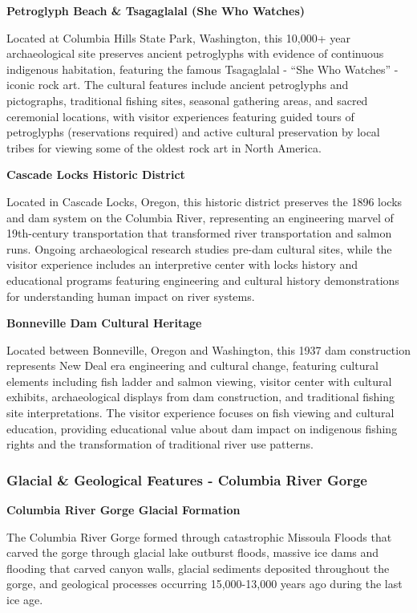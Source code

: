 \documentclass[
  11pt,
  letterpaper,
  DIV=10,
  numbers=noendperiod]{scrartcl}
\begin{document}
\textbf{Petroglyph Beach \& Tsagaglalal (She Who Watches)}

Located at Columbia Hills State Park, Washington, this 10,000+ year
archaeological site preserves ancient petroglyphs with evidence of
continuous indigenous habitation, featuring the famous Tsagaglalal -
``She Who Watches'' - iconic rock art. The cultural features include
ancient petroglyphs and pictographs, traditional fishing sites, seasonal
gathering areas, and sacred ceremonial locations, with visitor
experiences featuring guided tours of petroglyphs (reservations
required) and active cultural preservation by local tribes for viewing
some of the oldest rock art in North America.

\textbf{Cascade Locks Historic District}

Located in Cascade Locks, Oregon, this historic district preserves the
1896 locks and dam system on the Columbia River, representing an
engineering marvel of 19th-century transportation that transformed river
transportation and salmon runs. Ongoing archaeological research studies
pre-dam cultural sites, while the visitor experience includes an
interpretive center with locks history and educational programs
featuring engineering and cultural history demonstrations for
understanding human impact on river systems.

\textbf{Bonneville Dam Cultural Heritage}

Located between Bonneville, Oregon and Washington, this 1937 dam
construction represents New Deal era engineering and cultural change,
featuring cultural elements including fish ladder and salmon viewing,
visitor center with cultural exhibits, archaeological displays from dam
construction, and traditional fishing site interpretations. The visitor
experience focuses on fish viewing and cultural education, providing
educational value about dam impact on indigenous fishing rights and the
transformation of traditional river use patterns.

\subsubsection{Glacial \& Geological Features - Columbia River
Gorge}\label{glacial-geological-features---columbia-river-gorge}

\textbf{Columbia River Gorge Glacial Formation}

The Columbia River Gorge formed through catastrophic Missoula Floods
that carved the gorge through glacial lake outburst floods, massive ice
dams and flooding that carved canyon walls, glacial sediments deposited
throughout the gorge, and geological processes occurring 15,000-13,000
years ago during the last ice age.
\end{document}
